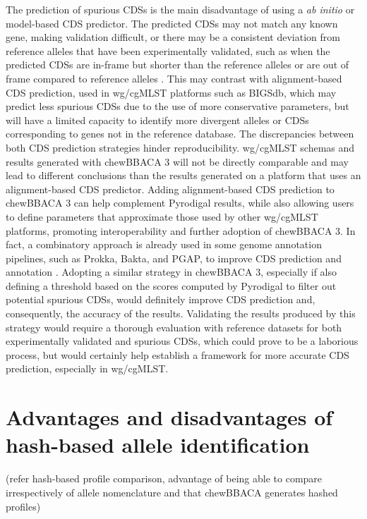 The prediction of spurious \ac{CDSs} is the main disadvantage of using a \textit{ab initio} or model-based \ac{CDS} predictor. The predicted \ac{CDSs} may not match any known gene, making validation difficult, or there may be a consistent deviation from reference alleles that have been experimentally validated, such as when the predicted \ac{CDSs} are in-frame but shorter than the reference alleles or are out of frame compared to reference alleles \cite{dimonaco_no_2022}. This may contrast with alignment-based \ac{CDS} prediction, used in \ac{wg/cgMLST} platforms such as \ac{BIGSdb}, which may predict less spurious \ac{CDSs} due to the use of more conservative parameters, but will have a limited capacity to identify more divergent alleles or \ac{CDSs} corresponding to genes not in the reference database. The discrepancies between both \ac{CDS} prediction strategies hinder reproducibility. wg/cgMLST schemas and results generated with chewBBACA 3 will not be directly comparable and may lead to different conclusions than the results generated on a platform that uses an alignment-based \ac{CDS} predictor. Adding alignment-based CDS prediction to chewBBACA 3 can help complement Pyrodigal results, while also allowing users to define parameters that approximate those used by other \ac{wg/cgMLST} platforms, promoting interoperability and further adoption of chewBBACA 3. In fact, a combinatory approach is already used in some genome annotation pipelines, such as Prokka, Bakta, and PGAP, to improve \ac{CDS} prediction and annotation \cite{seemann_prokka_2014, schwengers_bakta_2021, li_refseq_2021}. Adopting a similar strategy in chewBBACA 3, especially if also defining a threshold based on the scores computed by Pyrodigal to filter out potential spurious \ac{CDSs}, would definitely improve \ac{CDS} prediction and, consequently, the accuracy of the results. Validating the results produced by this strategy would require a thorough evaluation with reference datasets for both experimentally validated and spurious \ac{CDSs}, which could prove to be a laborious process, but would certainly help establish a framework for more accurate \ac{CDS} prediction, especially in \ac{wg/cgMLST}.

\section{Advantages and disadvantages of hash-based allele identification}

(refer hash-based profile comparison, advantage of being able to compare irrespectively of allele nomenclature and that chewBBACA generates hashed profiles)

